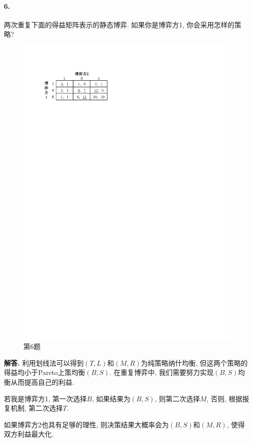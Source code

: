 \documentclass[12pt, a4paper, oneside]{ctexart}
\newenvironment{solution}{\par\noindent\textbf{解答. }}{\bigskip\par}
\begin{document}
\paragraph{6.}两次重复下面的得益矩阵表示的静态博弈. 如果你是博弈方1, 你会采用怎样的策略?
\begin{figure}[htbp]
    \centering
    \includegraphics[scale=1]{Economic4.6.pdf}
    \caption{第6题}
\end{figure}
\begin{solution}
    利用划线法可以得到$(T, L)$和$(M,R)$为纯策略纳什均衡, 但这两个策略的得益均小于Pareto上策均衡$(B,S)$. 在重复博弈中, 我们需要努力实现$(B,S)$均衡从而提高自己的利益.

    若我是博弈方1, 第一次选择$B$, 如果结果为$(B,S)$, 则第二次选择$M$, 否则, 根据报复机制, 第二次选择$T$.

    如果博弈方2也具有足够的理性, 则决策结果大概率会为$(B,S)$和$(M,R)$, 使得双方利益最大化.
\end{solution}
\end{document}
